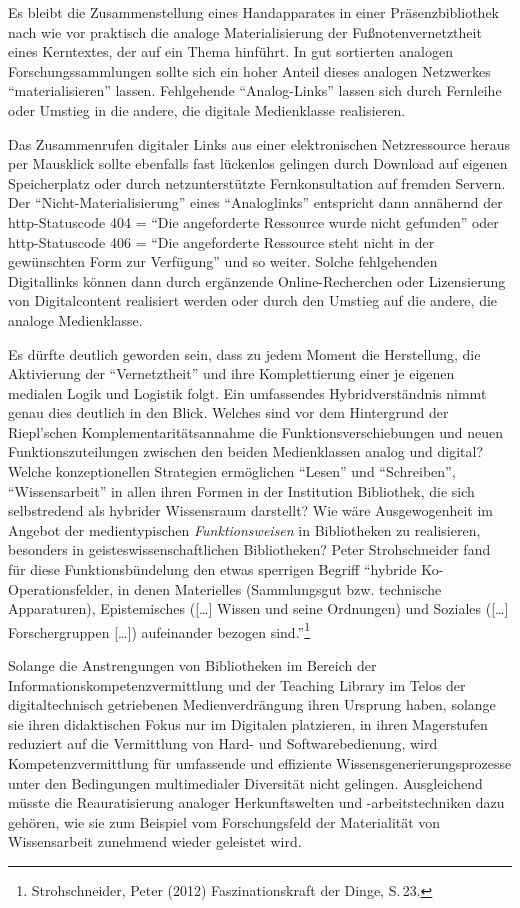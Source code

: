 \documentclass[a4paper,
fontsize=11pt,
oneside,
numbers=noperiodatend,
parskip=half-,
bibliography=totoc,
final
]{scrartcl}
\begin{document}
Es bleibt die Zusammenstellung eines Handapparates in einer
Präsenzbibliothek nach wie vor praktisch die analoge Materialisierung
der Fußnotenvernetztheit eines Kerntextes, der auf ein Thema hinführt.
In gut sortierten analogen Forschungssammlungen sollte sich ein hoher
Anteil dieses analogen Netzwerkes \enquote{materialisieren} lassen.
Fehlgehende \enquote{Analog-Links} lassen sich durch Fernleihe oder
Umstieg in die andere, die digitale Medienklasse realisieren.

Das Zusammenrufen digitaler Links aus einer elektronischen Netzressource
heraus per Maus\-klick sollte ebenfalls fast lückenlos gelingen durch
Download auf eigenen Speicherplatz oder durch netzunterstützte
Fernkonsultation auf fremden Servern. Der
\enquote{Nicht-Materialisierung} eines \enquote{Analoglinks} entspricht
dann annähernd der http-Statuscode 404 = \enquote{Die angeforderte
Ressource wurde nicht gefunden} oder http-Statuscode 406 = \enquote{Die
angeforderte Ressource steht nicht in der gewünschten Form zur
Verfügung} und so weiter. Solche fehlgehenden Digitallinks können dann
durch ergänzende Online-Recherchen oder Lizensierung von Digitalcontent
realisiert werden oder durch den Umstieg auf die andere, die analoge
Medienklasse.

Es dürfte deutlich geworden sein, dass zu jedem Moment die Herstellung,
die Aktivierung der \enquote{Vernetztheit} und ihre Komplettierung einer
je eigenen medialen Logik und Logistik folgt. Ein umfassendes
Hybridverständnis nimmt genau dies deutlich in den Blick. Welches sind
vor dem Hintergrund der Riepl'schen Komplementaritätsannahme die
Funktionsverschiebungen und neuen Funktionszuteilungen zwischen den
beiden Medienklassen analog und digital? Welche konzeptionellen
Strategien ermöglichen \enquote{Lesen} und \enquote{Schreiben},
\enquote{Wissensarbeit} in allen ihren Formen in der Institution
Bibliothek, die sich selbstredend als hybrider Wissensraum darstellt?
Wie wäre Ausgewogenheit im Angebot der medientypischen
\emph{Funktionsweisen} in Bibliotheken zu realisieren, besonders in
geisteswissenschaftlichen Bibliotheken? Peter Strohschneider fand für
diese Funktionsbündelung den etwas sperrigen Begriff \enquote{hybride
Ko-Operationsfelder, in denen Materielles (Sammlungsgut bzw. technische
Apparaturen), Epistemisches ({[}\ldots{}{]} Wissen und seine Ordnungen)
und Soziales ({[}\ldots{}{]} Forschergruppen {[}\ldots{}{]}) aufeinander
bezogen sind.}\footnote{Strohschneider, Peter (2012) Faszinationskraft
  der Dinge, S.\,23.}

Solange die Anstrengungen von Bibliotheken im Bereich der
Informationskompetenzvermittlung und der Teaching Library im Telos der
digitaltechnisch getriebenen Medienverdrängung ihren Ursprung haben,
solange sie ihren didaktischen Fokus nur im Digitalen platzieren, in
ihren Magerstufen reduziert auf die Vermittlung von Hard- und
Softwarebedienung, wird Kompetenzvermittlung für umfassende und
effiziente Wissensgenerierungsprozesse unter den Bedingungen
multimedialer Diversität nicht gelingen. Ausgleichend müsste die
Reauratisierung analoger Herkunftswelten und -arbeitstechniken dazu
gehören, wie sie zum Beispiel vom Forschungsfeld der Materialität von
Wissensarbeit zunehmend wieder geleistet wird.
\end{document}
